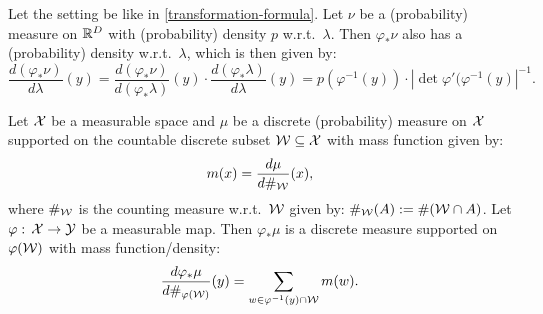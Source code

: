 \begin{Cor}
    Let the setting be like in \ref{transformation-formula}.
    Let $\nu$ be a (probability) measure on $\mathbb{R}^D$ with (probability) density $p$ w.r.t.\ $\lambda$.
    Then $\varphi_*\nu$ also has a (probability) density w.r.t.\ $\lambda$, which is then given by:
    \[ \frac{d(\varphi_*\nu)}{d\lambda}(y) = \frac{d(\varphi_*\nu)}{d(\varphi_*\lambda)}(y) \cdot \frac{d(\varphi_*\lambda)}{d\lambda}(y)  =  p(\varphi^{-1}(y)) \cdot |\det \varphi'(\varphi^{-1}(y)|^{-1}.   \]
\end{Cor}


\begin{Rem}
    Let $\mathcal{X}$ be a measurable space and $\mu$ be a discrete (probability) measure on $\mathcal{X}$ supported on the countable discrete subset $\mathcal{W} \subseteq \mathcal{X}$ with mass function given by:
    \[ m(x) = \frac{d\mu}{d\#_{\mathcal{W}}}(x),\]
    where $\#_{\mathcal{W}}$ is the counting measure w.r.t.\ $\mathcal{W}$ given by: $\#_{\mathcal{W}}(A) := \#(\mathcal{W} \cap A)$.
    Let $\varphi:\,\mathcal{X} \to \mathcal{Y}$ be a measurable map. Then $\varphi_*\mu$ is a discrete measure supported on $\varphi(\mathcal{W})$ 
    with mass function/density:
    \[ \frac{d\varphi_*\mu}{d\#_{\varphi(\mathcal{W})}}(y) = \sum_{ w \in \varphi^{-1}(y) \cap \mathcal{W} } m(w).
    \]
\end{Rem}

\begin{Eg}
\end{Eg}

\begin{Eg}
\end{Eg}





